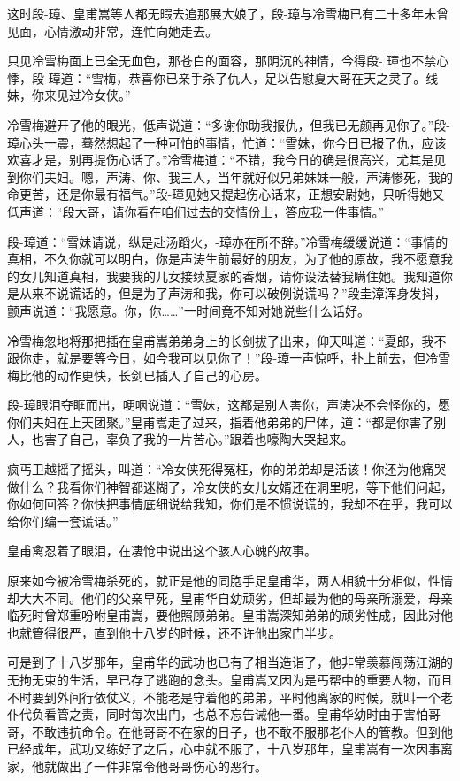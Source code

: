 \documentclass[12pt,oneside]{book}
\begin{document}
这时段-璋、皇甫嵩等人都无暇去追那展大娘了，段-璋与冷雪梅已有二十多年未曾见面，心情激动非常，连忙向她走去。

只见冷雪梅面上已全无血色，那苍白的面容，那阴沉的神情，今得段-
璋也不禁心悸，段-璋道：``雪梅，恭喜你已亲手杀了仇人，足以告慰夏大哥在天之灵了。线妹，你来见过冷女侠。''

冷雪梅避开了他的眼光，低声说道：``多谢你助我报仇，但我已无颜再见你了。''段-璋心头一震，蓦然想起了一种可怕的事情，忙道：``雪妹，你今日已报了仇，应该欢喜才是，别再提伤心话了。''冷雪梅道：``不错，我今日的确是很高兴，尤其是见到你们夫妇。嗯，声涛、你、我三人，当年就好似兄弟妹妹一般，声涛惨死，我的命更苦，还是你最有福气。''段-璋见她又提起伤心话来，正想安尉她，只听得她又低声道：``段大哥，请你看在咱们过去的交情份上，答应我一件事情。''

段-璋道：``雪妹请说，纵是赴汤蹈火，-璋亦在所不辞。''冷雪梅缓缓说道：``事情的真相，不久你就可以明白，你是声涛生前最好的朋友，为了他的原故，我不愿意我的女儿知道真相，我要我的儿女接续夏家的香烟，请你设法替我瞒住她。我知道你是从来不说谎话的，但是为了声涛和我，你可以破例说谎吗？''段圭漳浑身发抖，颤声说道：``我愿意。你，你\ldots\ldots{}''一时间竟不知对她说些什么话好。

冷雪梅忽地将那把插在皇甫嵩弟弟身上的长剑拔了出来，仰天叫道：``夏郎，我不跟你走，就是要等今日，如今我可以见你了！''段-璋一声惊呼，扑上前去，但冷雪梅比他的动作更快，长剑已插入了自己的心房。

段-璋眼泪夺眶而出，哽咽说道：``雪妹，这都是别人害你，声涛决不会怪你的，愿你们夫妇在上天团聚。''皇甫嵩走了过来，指着他弟弟的尸体，道：``都是你害了别人，也害了自己，辜负了我的一片苦心。''跟着也嚎陶大哭起来。

疯丐卫越摇了摇头，叫道：``冷女侠死得冤枉，你的弟弟却是活该！你还为他痛哭做什么？我看你们神智都迷糊了，冷女侠的女儿女婿还在洞里呢，等下他们问起，你如何回答？你快把事情底细说给我知，你们是不惯说谎的，我却不在乎，我可以给你们编一套谎话。''

皇甫禽忍着了眼泪，在凄怆中说出这个骇人心魄的故事。

原来如今被冷雪梅杀死的，就正是他的同胞手足皇甫华，两人相貌十分相似，性情却大大不同。他们的父亲早死，皇甫华自幼顽劣，但却最为他的母亲所溺爱，母亲临死时曾郑重吩咐皇甫嵩，要他照顾弟弟。皇甫嵩深知弟弟的顽劣性成，因此对他也就管得很严，直到他十八岁的时候，还不许他出家门半步。

可是到了十八岁那年，皇甫华的武功也已有了相当造诣了，他非常羡慕闯荡江湖的无拘无束的生活，早已存了逃跑的念头。皇甫嵩又因为是丐帮中的重要人物，而且不时要到外间行依仗义，不能老是守着他的弟弟，平时他离家的时候，就叫一个老仆代负看管之责，同时每次出门，也总不忘告诫他一番。皇甫华幼时由于害怕哥哥，不敢违抗命令。在他哥哥不在家的日子，也不敢不服那老仆人的管教。但到他已经成年，武功又练好了之后，心中就不服了，十八岁那年，皇甫嵩有一次因事离家，他就做出了一件非常令他哥哥伤心的恶行。
\end{document}

